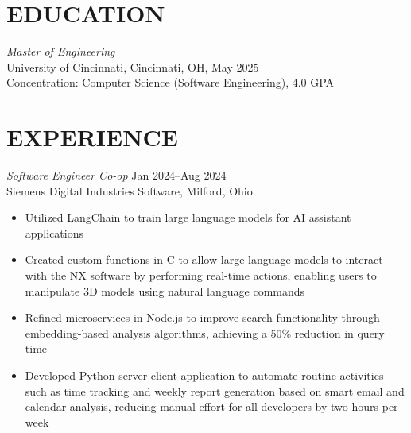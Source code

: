 \documentclass[margin]{res} %
\begin{document}
\begin{resume}
\vspace*{-5.0mm}


\section{EDUCATION}

{\sl Master of Engineering}\\
University of Cincinnati, Cincinnati, OH, May 2025 \\
Concentration: Computer Science (Software Engineering), 4.0 GPA

 
\section{EXPERIENCE}
{\sl Software Engineer Co-op} \hfill {\color{black} Jan 2024–Aug 2024} \\
Siemens Digital Industries Software, Milford, Ohio
\vspace{1mm}
\begin{itemize}  %
\item Utilized LangChain to train large language models for AI assistant applications 
\item Created custom functions in C to allow large language models to interact with the NX software by performing real-time actions, enabling users to manipulate 3D models using natural language commands 
\item Refined microservices in Node.js to improve search functionality through\\embedding-based analysis algorithms, achieving a 50\% reduction in query time 
\item Developed Python server-client application to automate routine activities such as time tracking and weekly report generation based on smart email and calendar analysis, reducing manual effort for all developers by two hours per week
\end{itemize}



\end{resume}
\end{document}
